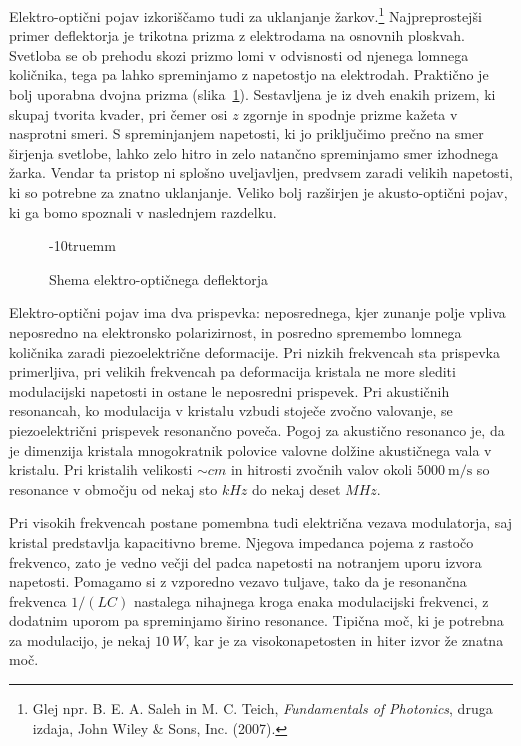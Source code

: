 \begin{remark}
Elektro-optični pojav izkoriščamo tudi za uklanjanje žarkov.\footnote{Glej npr. 
B. E. A. Saleh in M. C. Teich, 
{\it Fundamentals of Photonics}, druga izdaja, John Wiley \& Sons, Inc. (2007).}
Najpreprostejši primer deflektorja je trikotna prizma z elektrodama na osnovnih 
ploskvah. Svetloba se ob prehodu skozi prizmo lomi v odvisnosti od njenega 
lomnega količnika, tega pa lahko spreminjamo 
z napetostjo na elektrodah. Praktično je bolj uporabna dvojna prizma 
(slika~\ref{fig:deflshema}). Sestavljena je iz dveh enakih 
prizem, ki skupaj tvorita kvader, pri čemer osi $z$ zgornje in spodnje prizme
kažeta v nasprotni smeri. S spreminjanjem napetosti, ki jo priključimo prečno na smer
širjenja svetlobe, lahko zelo hitro in zelo natančno spreminjamo smer izhodnega žarka. 
Vendar ta pristop ni splošno uveljavljen, predvsem zaradi velikih napetosti, ki so 
potrebne za znatno uklanjanje. Veliko bolj razširjen je akusto-optični pojav, ki ga 
bomo spoznali v naslednjem razdelku. 
\begin{figure}[ht]
\centering
\def\svgwidth{65truemm} 

\caption{Shema elektro-optičnega deflektorja}
\label{fig:deflshema}
\vglue-10truemm
\end{figure}
\end{remark}
\begin{remark}
Elektro-optični pojav ima dva prispevka: neposrednega, kjer zunanje polje 
vpliva neposredno na elektronsko polarizirnost, in posredno spremembo
lomnega količnika zaradi piezoelektrične deformacije. Pri nizkih frekvencah sta prispevka 
primerljiva, pri velikih frekvencah pa deformacija kristala ne more slediti
modulacijski napetosti in ostane le neposredni prispevek. Pri akustičnih resonancah, ko 
modulacija v kristalu vzbudi stoječe zvočno valovanje, se piezoelektrični 
prispevek resonančno poveča. Pogoj za akustično resonanco je, da je dimenzija 
kristala mnogokratnik polovice valovne dolžine akustičnega vala v kristalu. 
Pri kristalih velikosti $\sim \si{cm}$ in hitrosti zvočnih valov okoli
$5000~\si{\m/\s}$ so resonance v območju od nekaj sto $\si{kHz}$ do
nekaj deset $\si{MHz}$. 

Pri visokih frekvencah postane pomembna tudi električna vezava modulatorja,
saj kristal predstavlja kapacitivno breme. Njegova impedanca pojema z 
rastočo frekvenco, zato je vedno večji del padca napetosti na notranjem 
uporu izvora napetosti. Pomagamo si z vzporedno vezavo tuljave, 
tako da je resonančna frekvenca $1/(LC)$ nastalega nihajnega kroga 
enaka modulacijski frekvenci, z dodatnim uporom pa spreminjamo širino resonance.
Tipična moč, ki je potrebna za modulacijo, je nekaj $10~\si{W}$, 
kar je za visokonapetosten in hiter izvor že znatna moč. 
\end{remark}

